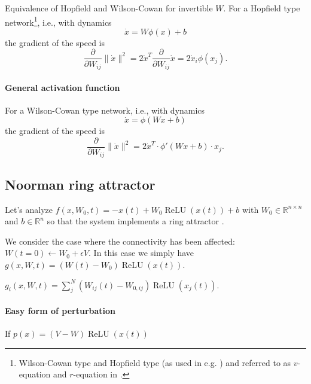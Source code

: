 \documentclass{article}
\theoremstyle{definition} \newtheorem{definition}{Definition}
\theoremstyle{remark} \newtheorem{remark}{Remark}
\newcommand{\reals}{\mathbb{R}}
\newcommand{\relu}{\operatorname{ReLU}}
\newcounter{ct}
\begin{document}
Equivalence of Hopfield and Wilson-Cowan\citep{miller2012mathematical} for invertible $W$.
For a Hopfield type network\footnote{Wilson-Cowan type and Hopfield type (as used in e.g. \citep{gort2024emergence}) and referred to as $v$-equation and $r$-equation in \citep{miller2012mathematical}.}, i.e., with dynamics 
\begin{equation}\label{sec:hopfieldode}
\dot x = W\phi(x) + b
\end{equation}
 the gradient of the speed is
\begin{equation}
\frac{\partial}{\partial W_{ij}}\|\dot x \|^2 = 2 \dot x^T \frac{\partial}{\partial W_{ij}}\dot x = 2 \dot x_i\phi(x_j).
\end{equation}



\paragraph{General activation function}
For a Wilson-Cowan type network, i.e., with dynamics 
\begin{equation}
\dot x = \phi(Wx+b) 
\end{equation}
 the gradient of the speed is
\begin{equation}
\frac{\partial}{\partial W_{ij}} \|\dot{x}\|^2 = 2 \dot{x}^T \cdot \phi'(Wx+b) \cdot x_j.
\end{equation}



\subsection{Noorman ring attractor}
Let's analyze $f(x,W_0,t) = -x(t) + W_0\relu(x(t)) + b$ with $W_0\in\reals^{n\times n}$ and $b\in\reals^n$ so that the system implements a ring attractor \citep{noorman2024accurate}.

We consider the case where the connectivity has been affected: $W(t=0) \leftarrow W_0 + \epsilon V$.
In this case we simply have $g(x,W,t) = (W(t)-W_0)\relu(x(t))$.

$g_i(x,W,t) = \sum_{j}^N(W_{ij}(t)-W_{0,ij})\relu(x_j(t))$.


\paragraph{Easy form of perturbation}
If $p(x) = (V-W)\relu(x(t))$
\end{document}
